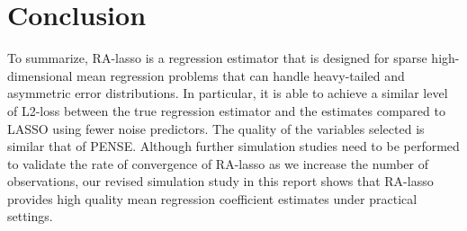 

\section{Conclusion}\label{sec:conclusion}
To summarize, RA-lasso is a regression estimator that is designed for sparse high-dimensional mean regression problems that can handle heavy-tailed and asymmetric error distributions. In particular, it is able to achieve a similar level of L2-loss between the true regression estimator and the estimates compared to LASSO using fewer noise predictors. The quality of the variables selected is similar that of PENSE. Although further simulation studies need to be performed to validate the rate of convergence of RA-lasso as we increase the number of observations, our revised simulation study in this report shows that RA-lasso provides high quality mean regression coefficient estimates under practical settings.